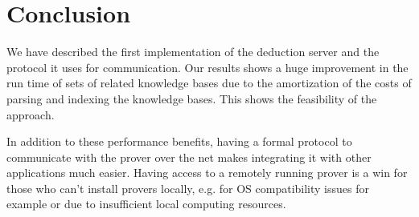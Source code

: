 \chapter{Conclusion}\label{chap:concl}

We have described the first implementation of the deduction server and the protocol it uses for communication. Our results shows a huge improvement in the run time of sets of related knowledge bases due to the amortization of the costs of parsing and indexing the knowledge bases. This shows the feasibility of the approach.

 In addition to these performance benefits, having a formal protocol to communicate with the prover over the net makes integrating it with other applications much easier. Having access to a remotely running prover is a win for those who can't install provers locally, e.g. for OS compatibility issues for example or due to insufficient local computing resources.
